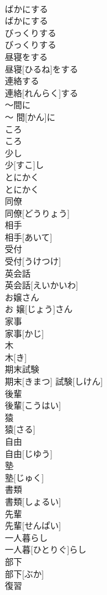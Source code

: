 \documentclass[8pt]{extreport}
\begin{document}
\begin{CJK}{UTF8}{min}
\\	ばかにする	
\\	ばかにする
\\	びっくりする	
\\	びっくりする
\\	昼寝をする	
\\	昼寝[ひるね]をする
\\	連絡する	
\\	連絡[れんらく]する
\\	〜間に	
\\	〜 間[かん]に
\\	ころ	
\\	ころ
\\	少し	
\\	少[すこ]し
\\	とにかく	
\\	とにかく
\\	同僚	
\\	同僚[どうりょう]
\\	相手	
\\	相手[あいて]
\\	受付	
\\	受付[うけつけ]
\\	英会話	
\\	英会話[えいかいわ]
\\	お嬢さん	
\\	お 嬢[じょう]さん
\\	家事	
\\	家事[かじ]
\\	木	
\\	木[き]
\\	期末試験	
\\	期末[きまつ] 試験[しけん]
\\	後輩	
\\	後輩[こうはい]
\\	猿	
\\	猿[さる]
\\	自由	
\\	自由[じゆう]
\\	塾	
\\	塾[じゅく]
\\	書類	
\\	書類[しょるい]
\\	先輩	
\\	先輩[せんぱい]
\\	一人暮らし	
\\	一人暮[ひとりぐ]らし
\\	部下	
\\	部下[ぶか]
\\	復習	

\end{CJK}
\end{document}
